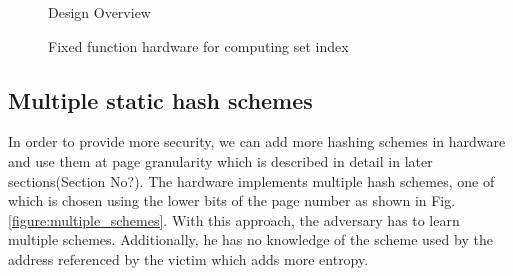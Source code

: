 \begin{figure}
  \caption{Design Overview}
  \label{figure:design_overview}
\end{figure}


\begin{figure}
  \caption{Fixed function hardware for computing set index}
  \label{figure:fixed_func_hw}
\end{figure}

\subsection{Multiple static hash schemes}
In order to provide more security, we can add more hashing schemes in hardware and use them at page granularity which is described in detail in later sections(Section No?). The hardware implements multiple hash schemes, one of which is chosen using the lower bits of the page number as shown in Fig. \ref{figure:multiple_schemes}. With this approach, the adversary has to learn multiple schemes. Additionally, he has no knowledge of the scheme used by the address referenced by the victim which adds more entropy.

